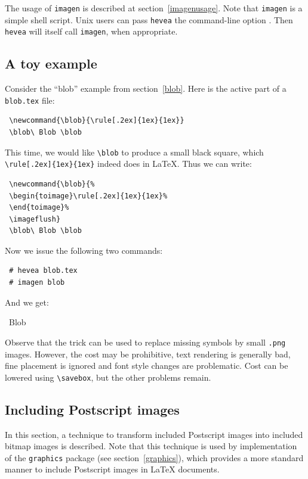 The  usage of \verb+imagen+  is described at
section~\ref{imagenusage}. Note that \texttt{imagen} is a simple shell
script. Unix users can pass \texttt{hevea} the command-line option
. Then \texttt{hevea} will
itself call \texttt{imagen}, when appropriate.





\subsection{A toy example}
Consider the ``blob'' example from section~\ref{blob}.
Here is the active part of a \texttt{blob.tex} file:
\begin{verbatim}
 \newcommand{\blob}{\rule[.2ex]{1ex}{1ex}}
 \blob\ Blob \blob
\end{verbatim}
This time, we would like \verb+\blob+ to produce a small black square, which
\verb+\rule[.2ex]{1ex}{1ex}+ indeed does in \LaTeX{}.
Thus we can write:
\begin{verbatim}
 \newcommand{\blob}{%
 \begin{toimage}\rule[.2ex]{1ex}{1ex}%
 \end{toimage}%
 \imageflush}
 \blob\ Blob \blob
\end{verbatim}
Now we issue the following two commands:
\begin{verbatim}
 # hevea blob.tex
 # imagen blob
\end{verbatim}
And we get:
\begin{htmlout}
\begin{htmlonly}
\newcommand{\blob}{%
\begin{toimage}\rule[.2ex]{1ex}{1ex}%
\end{toimage}%
\imageflush}\newsavebox{\blobbox}\sbox{\blobbox}{\blob}
\usebox{\blobbox}\ Blob \usebox{\blobbox}
\end{htmlonly}
\begin{latexonly}\vspace*{.5ex}
\end{latexonly}%
\end{htmlout}

Observe that the trick can be used to replace missing symbols by small
\texttt{.png} images. However, the cost may be prohibitive, text rendering
is generally bad, fine placement is ignored and font style changes are
problematic.
Cost can be lowered using \verb+\savebox+, but the other problems remain.


\subsection{Including Postscript images}\label{substimage}
In this section, a technique to transform included Postscript images
into included bitmap images is described.
Note that this technique is used by \hevea{} implementation of the
\texttt{graphics} package (see section~\ref{graphics}),
which provides a more standard manner to include Postscript images in
\LaTeX{} documents.

